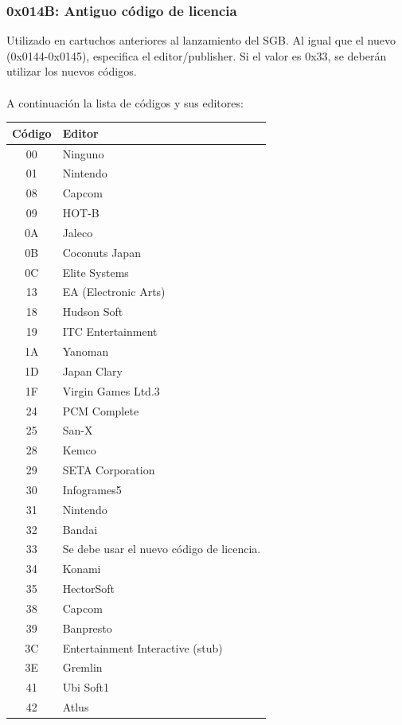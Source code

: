 \subsubsection{0x014B: Antiguo código de licencia}
Utilizado en cartuchos anteriores al lanzamiento del SGB. Al igual que el nuevo (0x0144-0x0145), especifica el editor/publisher. Si el valor es 0x33, se deberán utilizar los nuevos códigos.
\\\\
A continuación la lista de códigos y sus editores:
\begin{longtable}{|c|l|}
\hline
\textbf{Código} & \textbf{Editor} \\ \hline
00 & Ninguno \\\hline
01 & Nintendo \\\hline
08 & Capcom \\\hline
09 & HOT-B \\\hline
0A & Jaleco \\\hline
0B & Coconuts Japan \\\hline
0C & Elite Systems \\\hline
13 & EA (Electronic Arts) \\\hline
18 & Hudson Soft \\\hline
19 & ITC Entertainment \\\hline
1A & Yanoman \\\hline
1D & Japan Clary \\\hline
1F & Virgin Games Ltd.3 \\\hline
24 & PCM Complete \\\hline
25 & San-X \\\hline
28 & Kemco \\\hline
29 & SETA Corporation \\\hline
30 & Infogrames5 \\\hline
31 & Nintendo \\\hline
32 & Bandai \\\hline
33 & Se debe usar el nuevo código de licencia. \\\hline
34 & Konami \\\hline
35 & HectorSoft \\\hline
38 & Capcom \\\hline
39 & Banpresto \\\hline
3C & Entertainment Interactive (stub) \\\hline
3E & Gremlin \\\hline
41 & Ubi Soft1 \\\hline
42 & Atlus \\\hline

\end{longtable}
